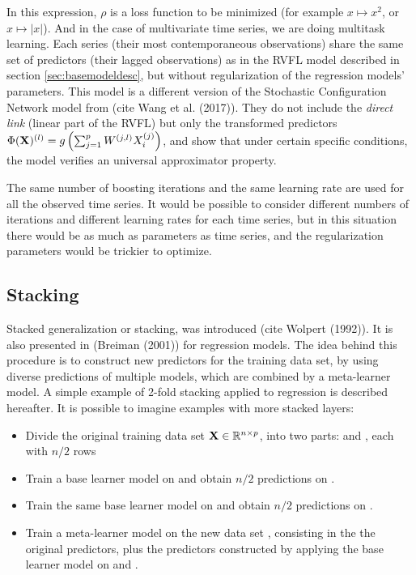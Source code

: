 In this expression, $\rho$ is a loss function to be minimized (for example $x \mapsto x^2$, or $x \mapsto |x|$). And in the case of multivariate time series, we are doing multitask learning. Each series (their most contemporaneous observations) share the same set of predictors (their lagged observations) as in the RVFL model described in section \ref{sec:basemodeldesc}, but without regularization of the regression models' parameters. This model is a different version of the Stochastic Configuration Network model from (cite Wang et al. (2017)). They do not include the \textit{direct link} (linear part of the RVFL) but only the transformed predictors $\Phi({\bf X})^{(l)}= g\left(\sum_{j = 1}^p W^{(j, l)} X_i^{(j)}\right)$, and show that under certain specific conditions, the model verifies an universal approximator property. 

The same number of boosting iterations and the same learning rate are used for all the observed time series. It would be possible to consider different numbers of iterations and different learning rates for each time series, but in this situation there would be as much as parameters as time series, and the regularization parameters would be trickier to optimize. 

\subsection{Stacking}
\label{sec:rvflstacking}

Stacked generalization or stacking, was introduced (cite Wolpert (1992)). It is also presented in (Breiman (2001)) for regression models. The idea behind this procedure is to construct new predictors for the training data set, by using diverse predictions of multiple models, which are combined by a meta-learner model. A simple example of 2-fold stacking applied to regression is described hereafter. It is possible to imagine examples with more stacked layers:

\begin{itemize}
\item Divide the original training data set $\textbf{X} \in \mathbb{R}^{n \times p}$, into two parts:  and , each with $n/2$ rows
\item Train a base learner model on  and obtain $n/2$ predictions on .
\item Train the same base learner model on  and obtain $n/2$ predictions on .
\item Train a  meta-learner model on the new data set , consisting in the the original predictors, plus the predictors constructed by applying the base learner model on  and .
\end{itemize}
\medskip

